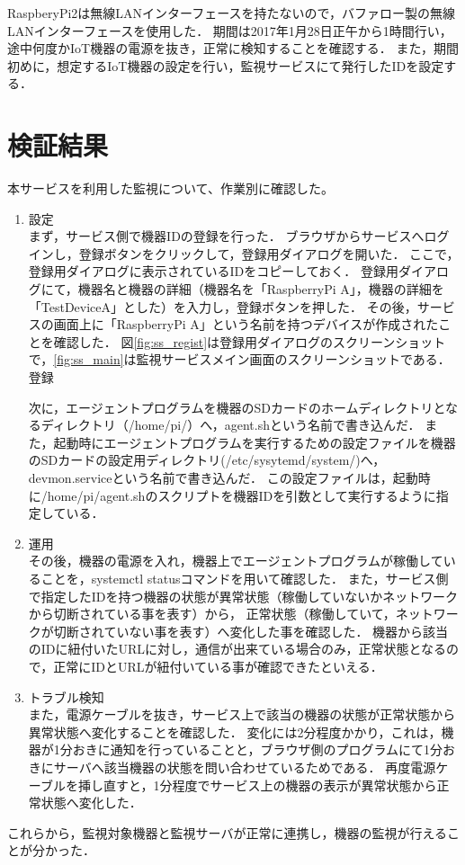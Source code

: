RaspberyPi2は無線LANインターフェースを持たないので，バファロー製の無線LANインターフェースを使用した．
期間は2017年1月28日正午から1時間行い，途中何度かIoT機器の電源を抜き，正常に検知することを確認する．
また，期間初めに，想定するIoT機器の設定を行い，監視サービスにて発行したIDを設定する．

\section{検証結果}
本サービスを利用した監視について、作業別に確認した。
\begin{enumerate}
\item 設定\\
まず，サービス側で機器IDの登録を行った．
ブラウザからサービスへログインし，登録ボタンをクリックして，登録用ダイアログを開いた．
ここで，登録用ダイアログに表示されているIDをコピーしておく．
登録用ダイアログにて，機器名と機器の詳細（機器名を「RaspberryPi A」，機器の詳細を「TestDeviceA」とした）を入力し，登録ボタンを押した．
その後，サービスの画面上に「RaspberryPi A」という名前を持つデバイスが作成されたことを確認した．
図\ref{fig:ss_regist}は登録用ダイアログのスクリーンショットで，\ref{fig:ss_main}は監視サービスメイン画面のスクリーンショットである．
登録
\medskip

次に，エージェントプログラムを機器のSDカードのホームディレクトリとなるディレクトリ（/home/pi/）へ，agent.shという名前で書き込んだ．
また，起動時にエージェントプログラムを実行するための設定ファイルを機器のSDカードの設定用ディレクトリ(/etc/sysytemd/system/)へ，devmon.serviceという名前で書き込んだ．
この設定ファイルは，起動時に/home/pi/agent.shのスクリプトを機器IDを引数として実行するように指定している．

\item 運用\\
その後，機器の電源を入れ，機器上でエージェントプログラムが稼働していることを，systemctl statusコマンドを用いて確認した．
また，サービス側で指定したIDを持つ機器の状態が異常状態（稼働していないかネットワークから切断されている事を表す）から，
正常状態（稼働していて，ネットワークが切断されていない事を表す）へ変化した事を確認した．
機器から該当のIDに紐付いたURLに対し，通信が出来ている場合のみ，正常状態となるので，正常にIDとURLが紐付いている事が確認できたといえる．

\item トラブル検知\\
また，電源ケーブルを抜き，サービス上で該当の機器の状態が正常状態から異常状態へ変化することを確認した．
変化には2分程度かかり，これは，機器が1分おきに通知を行っていることと，ブラウザ側のプログラムにて1分おきにサーバへ該当機器の状態を問い合わせているためである．
再度電源ケーブルを挿し直すと，1分程度でサービス上の機器の表示が異常状態から正常状態へ変化した．
\end{enumerate}
これらから，監視対象機器と監視サーバが正常に連携し，機器の監視が行えることが分かった．







